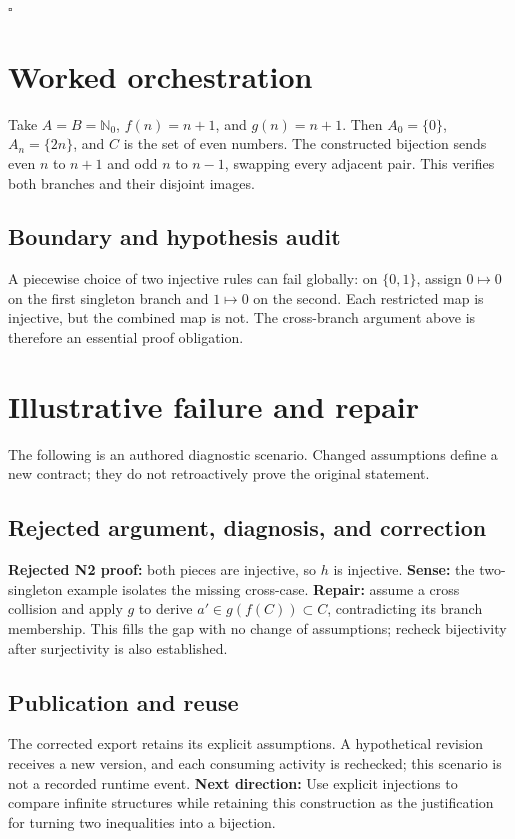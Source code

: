 \documentclass[preprint,12pt,aps,pra,showkeys,amsmath,amssymb,superscriptaddress,floatfix]{revtex4-2}
\theoremstyle{definition}
\theoremstyle{remark}
\begin{document}
\hfill$\square$

\section{Worked orchestration}

Take \(A=B=\mathbb N_0\), \(f(n)=n+1\), and \(g(n)=n+1\). Then
\(A_0=\{0\}\), \(A_n=\{2n\}\), and \(C\) is the set of even numbers. The
constructed bijection sends even \(n\) to \(n+1\) and odd \(n\) to
\(n-1\), swapping every adjacent pair. This verifies both branches and
their disjoint images.

\subsection{Boundary and hypothesis audit}

A piecewise choice of two injective rules can fail globally: on
\(\{0,1\}\), assign \(0\mapsto0\) on the first singleton branch and
\(1\mapsto0\) on the second. Each restricted map is injective, but the
combined map is not. The cross-branch argument above is therefore an
essential proof obligation.

\section{Illustrative failure and repair}

The following is an authored diagnostic scenario. Changed assumptions
define a new contract; they do not retroactively prove the original
statement.

\subsection{Rejected argument, diagnosis, and correction}
\textbf{Rejected N2 proof:} both pieces are injective, so \(h\) is
injective. \textbf{Sense:} the two-singleton example isolates the
missing cross-case. \textbf{Repair:} assume a cross collision and apply
\(g\) to derive \(a'\in g(f(C))\subset C\), contradicting its branch
membership. This fills the gap with no change of assumptions; recheck
bijectivity after surjectivity is also established.

\subsection{Publication and reuse}
The corrected export retains its explicit assumptions. A hypothetical
revision receives a new version, and each consuming activity is
rechecked; this scenario is not a recorded runtime event. \textbf{Next
direction:} Use explicit injections to compare infinite structures while
retaining this construction as the justification for turning two
inequalities into a bijection.
\end{document}
